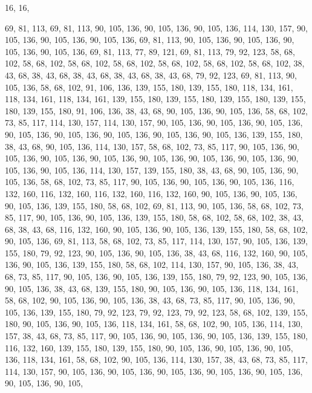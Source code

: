 16, 16,

69, 81, 113, 69, 81, 113, 90, 105, 136, 90, 105, 136, 90, 105, 136, 114,
130, 157, 90, 105, 136, 90, 105, 136, 90, 105, 136, 69, 81, 113, 90, 105,
136, 90, 105, 136, 90, 105, 136, 90, 105, 136, 69, 81, 113, 77, 89, 121,
69, 81, 113, 79, 92, 123, 58, 68, 102, 58, 68, 102, 58, 68, 102, 58,
68, 102, 58, 68, 102, 58, 68, 102, 58, 68, 102, 38, 43, 68, 38, 43,
68, 38, 43, 68, 38, 43, 68, 38, 43, 68, 79, 92, 123, 69, 81, 113,
90, 105, 136, 58, 68, 102, 91, 106, 136, 139, 155, 180, 139, 155, 180, 118,
134, 161, 118, 134, 161, 118, 134, 161, 139, 155, 180, 139, 155, 180, 139, 155,
180, 139, 155, 180, 139, 155, 180, 91, 106, 136, 38, 43, 68, 90, 105, 136,
90, 105, 136, 58, 68, 102, 73, 85, 117, 114, 130, 157, 114, 130, 157, 90,
105, 136, 90, 105, 136, 90, 105, 136, 90, 105, 136, 90, 105, 136, 90, 105,
136, 90, 105, 136, 90, 105, 136, 139, 155, 180, 38, 43, 68, 90, 105, 136,
114, 130, 157, 58, 68, 102, 73, 85, 117, 90, 105, 136, 90, 105, 136, 90,
105, 136, 90, 105, 136, 90, 105, 136, 90, 105, 136, 90, 105, 136, 90, 105,
136, 90, 105, 136, 114, 130, 157, 139, 155, 180, 38, 43, 68, 90, 105, 136,
90, 105, 136, 58, 68, 102, 73, 85, 117, 90, 105, 136, 90, 105, 136, 90,
105, 136, 116, 132, 160, 116, 132, 160, 116, 132, 160, 116, 132, 160, 90, 105,
136, 90, 105, 136, 90, 105, 136, 139, 155, 180, 58, 68, 102, 69, 81, 113,
90, 105, 136, 58, 68, 102, 73, 85, 117, 90, 105, 136, 90, 105, 136, 139,
155, 180, 58, 68, 102, 58, 68, 102, 38, 43, 68, 38, 43, 68, 116, 132,
160, 90, 105, 136, 90, 105, 136, 139, 155, 180, 58, 68, 102, 90, 105, 136,
69, 81, 113, 58, 68, 102, 73, 85, 117, 114, 130, 157, 90, 105, 136, 139,
155, 180, 79, 92, 123, 90, 105, 136, 90, 105, 136, 38, 43, 68, 116, 132,
160, 90, 105, 136, 90, 105, 136, 139, 155, 180, 58, 68, 102, 114, 130, 157,
90, 105, 136, 38, 43, 68, 73, 85, 117, 90, 105, 136, 90, 105, 136, 139,
155, 180, 79, 92, 123, 90, 105, 136, 90, 105, 136, 38, 43, 68, 139, 155,
180, 90, 105, 136, 90, 105, 136, 118, 134, 161, 58, 68, 102, 90, 105, 136,
90, 105, 136, 38, 43, 68, 73, 85, 117, 90, 105, 136, 90, 105, 136, 139,
155, 180, 79, 92, 123, 79, 92, 123, 79, 92, 123, 58, 68, 102, 139, 155,
180, 90, 105, 136, 90, 105, 136, 118, 134, 161, 58, 68, 102, 90, 105, 136,
114, 130, 157, 38, 43, 68, 73, 85, 117, 90, 105, 136, 90, 105, 136, 90,
105, 136, 139, 155, 180, 116, 132, 160, 139, 155, 180, 139, 155, 180, 90, 105,
136, 90, 105, 136, 90, 105, 136, 118, 134, 161, 58, 68, 102, 90, 105, 136,
114, 130, 157, 38, 43, 68, 73, 85, 117, 114, 130, 157, 90, 105, 136, 90,
105, 136, 90, 105, 136, 90, 105, 136, 90, 105, 136, 90, 105, 136, 90, 105,

